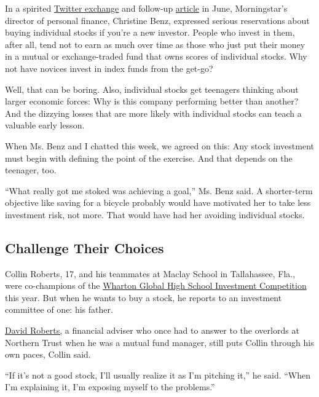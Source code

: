 In a spirited
\href{https://twitter.com/christine_benz/status/1273626396267614209}{Twitter
exchange} and follow-up
\href{https://www.morningstar.com/articles/988805/theres-got-to-be-a-better-way}{article}
in June, Morningstar's director of personal finance, Christine Benz,
expressed serious reservations about buying individual stocks if you're
a new investor. People who invest in them, after all, tend not to earn
as much over time as those who just put their money in a mutual or
exchange-traded fund that owns scores of individual stocks. Why not have
novices invest in index funds from the get-go?

Well, that can be boring. Also, individual stocks get teenagers thinking
about larger economic forces: Why is this company performing better than
another? And the dizzying losses that are more likely with individual
stocks can teach a valuable early lesson.

When Ms. Benz and I chatted this week, we agreed on this: Any stock
investment must begin with defining the point of the exercise. And that
depends on the teenager, too.

``What really got me stoked was achieving a goal,'' Ms. Benz said. A
shorter-term objective like saving for a bicycle probably would have
motivated her to take less investment risk, not more. That would have
had her avoiding individual stocks.

\hypertarget{challenge-their-choices}{%
\subsection{Challenge Their Choices}\label{challenge-their-choices}}

Collin Roberts, 17, and his teammates at Maclay School in Tallahassee,
Fla., were co-champions of the
\href{https://kwhs.wharton.upenn.edu/news/2020-investment-competition-global-finale-ends-tie-first-place/}{Wharton
Global High School Investment Competition} this year. But when he wants
to buy a stock, he reports to an investment committee of one: his
father.

\href{https://harvestinvestmentadvisors.com/}{David Roberts,} a
financial adviser who once had to answer to the overlords at Northern
Trust when he was a mutual fund manager, still puts Collin through his
own paces, Collin said.

``If it's not a good stock, I'll usually realize it as I'm pitching
it,'' he said. ``When I'm explaining it, I'm exposing myself to the
problems.''

